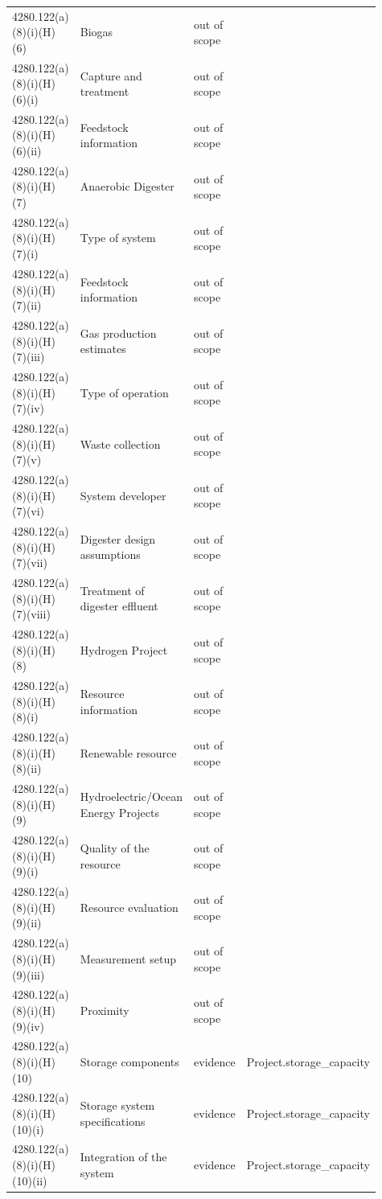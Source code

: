 \begin{longtable}{p{0.2\linewidth}p{0.2\linewidth}p{0.09\linewidth}p{0.42\linewidth}}
4280.122(a)(8)(i)(H)(6) & Biogas & out of scope &  \\
4280.122(a)(8)(i)(H)(6)(i) & Capture and treatment & out of scope &  \\
4280.122(a)(8)(i)(H)(6)(ii) & Feedstock information & out of scope &  \\
4280.122(a)(8)(i)(H)(7) & Anaerobic Digester & out of scope &  \\
4280.122(a)(8)(i)(H)(7)(i) & Type of system & out of scope &  \\
4280.122(a)(8)(i)(H)(7)(ii) & Feedstock information & out of scope &  \\
4280.122(a)(8)(i)(H)(7)(iii) & Gas production estimates & out of scope &  \\
4280.122(a)(8)(i)(H)(7)(iv) & Type of operation & out of scope &  \\
4280.122(a)(8)(i)(H)(7)(v) & Waste collection & out of scope &  \\
4280.122(a)(8)(i)(H)(7)(vi) & System developer & out of scope &  \\
4280.122(a)(8)(i)(H)(7)(vii) & Digester design assumptions & out of scope &  \\
4280.122(a)(8)(i)(H)(7)(viii) & Treatment of digester effluent & out of scope &  \\
4280.122(a)(8)(i)(H)(8) & Hydrogen Project & out of scope &  \\
4280.122(a)(8)(i)(H)(8)(i) & Resource information & out of scope &  \\
4280.122(a)(8)(i)(H)(8)(ii) & Renewable resource & out of scope &  \\
4280.122(a)(8)(i)(H)(9) & Hydroelectric/Ocean Energy Projects & out of scope &  \\
4280.122(a)(8)(i)(H)(9)(i) & Quality of the resource & out of scope &  \\
4280.122(a)(8)(i)(H)(9)(ii) & Resource evaluation & out of scope &  \\
4280.122(a)(8)(i)(H)(9)(iii) & Measurement setup & out of scope &  \\
4280.122(a)(8)(i)(H)(9)(iv) & Proximity & out of scope &  \\
4280.122(a)(8)(i)(H)(10) & Storage components & evidence & Project.storage\_capacity \\
4280.122(a)(8)(i)(H)(10)(i) & Storage system specifications & evidence & Project.storage\_capacity \\
4280.122(a)(8)(i)(H)(10)(ii) & Integration of the system & evidence & Project.storage\_capacity \\

\end{longtable}
